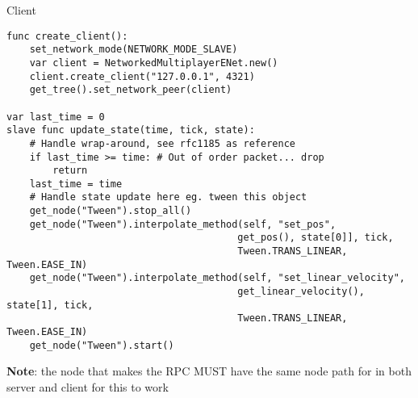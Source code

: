 \begin{frame}[fragile]{Client}
    
\begin{lstlisting}
func create_client():
	set_network_mode(NETWORK_MODE_SLAVE)
	var client = NetworkedMultiplayerENet.new()
	client.create_client("127.0.0.1", 4321)
	get_tree().set_network_peer(client)

var last_time = 0
slave func update_state(time, tick, state):
	# Handle wrap-around, see rfc1185 as reference
	if last_time >= time: # Out of order packet... drop
		return
	last_time = time
	# Handle state update here eg. tween this object
	get_node("Tween").stop_all()
	get_node("Tween").interpolate_method(self, "set_pos", 
                                        get_pos(), state[0]], tick,
                                        Tween.TRANS_LINEAR, Tween.EASE_IN)
	get_node("Tween").interpolate_method(self, "set_linear_velocity", 
                                        get_linear_velocity(), state[1], tick, 
                                        Tween.TRANS_LINEAR, Tween.EASE_IN)
	get_node("Tween").start()
\end{lstlisting}

\footnotesize{\textbf{Note}: the node that makes the RPC MUST have the same node path for in both server and client for this to work}
    
\end{frame}